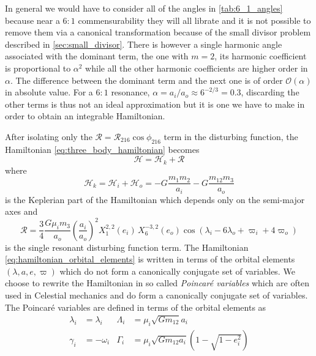 \documentclass[twoside,openright,titlepage,numbers=noenddot,headinclude,%
                footinclude=true,cleardoublepage=empty,abstractoff, 
                BCOR=5mm,paper=a4,fontsize=11pt,%
                american,%
                ]{scrreprt}%
\begin{document}
In general we would have to consider all of the angles in \cref{tab:6_1_angles}
because near a $6:1$ commensurability they will all librate and it is not possible
to remove them via a canonical transformation because of the small
divisor problem described in \cref{sec:small_divisor}.
There is however a single harmonic angle associated with the dominant term, the one with 
$m=2$, its harmonic coefficient is proportional to $\alpha^2$
while all the other harmonic coefficients
are higher order in $\alpha$. The difference between the dominant term and the 
next one is of order $\mathcal{O}(\alpha)$ in absolute value. For a $6:1$ resonance, 
$\alpha=a_i/a_o\approx 6^{-2/3}=0.3$, discarding the other terms is thus
not an ideal approximation but it is one we have to make in order to obtain 
an integrable Hamiltonian. 

After isolating only the $\mathcal{R}=\mathcal{R}_{216}
\cos\phi_{216}$ term in the disturbing function, the Hamiltonian
\ref{eq:three_body_hamiltonian} becomes
\begin{equation}
    \mathcal{H}=\mathcal{H}_k+\mathcal{R}
    \label{eq:hamiltonian_orbital_elements}
\end{equation}
where
\begin{equation}
    \mathcal{H}_k=\mathcal{H}_i+\mathcal{H}_o=
    -G \frac{m_1m_2}{a_i} -G \frac{m_{12}m_3}{a_o}
\end{equation}
is the Keplerian part of the Hamiltonian which depends only on the 
semi-major axes and
\begin{equation}
    \mathcal{R}=\frac{3}{4}\frac{G\mu_im_3}{a_o}\left(\frac{a_i}{a_o}\right)^2
    X^{2,2}_1(e_i)\,X^{-3,2}_6(e_o)\cos(\lambda_i-6\lambda_o+
    \varpi_i + 4\varpi_o)
\end{equation}
is the single resonant disturbing function term. The Hamiltonian 
\ref{eq:hamiltonian_orbital_elements} is written in terms of the
orbital elements $(\lambda,a,e,\varpi)$ which do not form a canonically
conjugate set of variables. We choose to rewrite the Hamiltonian in
so called \emph{Poincaré variables} which are often used in Celestial 
mechanics and do form a canonically conjugate set of variables. The Poincaré
variables are defined in terms of the orbital elements as
\begin{equation}
    \begin{aligned}
        \lambda_i&=\lambda_i &\Lambda_i&=\mu_i\sqrt{Gm_{12}}a_i\\
        \gamma_i&=-\omega_i & \Gamma_i&=\mu_i\sqrt{Gm_{12}a_i}
    \left(1-\sqrt{1-e_i^2}\right)
\end{aligned}
\label{eq:poincare_variables}
\end{equation}
\end{document}
